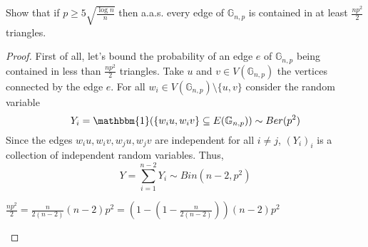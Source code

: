 \begin{problem}
    Show that if $p \geq 5 \sqrt{\frac{\log{n}}{n}}$ then a.a.s. every edge of $\mathbb{G}_{n,p}$ is contained in at least $\frac{n p^2}{2}$ triangles.
    \begin{sol}
        \begin{proof}
            First of all, let's bound the probability of an edge $e$ of $\mathbb{G}_{n,p}$ being contained in less than $\frac{n p^2}{2}$ triangles.
            Take $u$ and $v \in V(\mathbb{G}_{n,p})$ the vertices connected by the edge $e$.
            For all $w_i \in V(\mathbb{G}_{n,p}) \setminus \{u, v\}$ consider the random variable
            \[ Y_i = \mathbbm{1}(\{w_i u, w_i v\} \subseteq E(\mathbb{G}_{n,p})) \sim Ber(p^2) \]
            Since the edges $w_i u, w_i v, w_j u, w_j v$ are independent for all $i \neq j$, $(Y_i)_i$ is a collection of independent random variables.
            Thus,
            \[ Y = \sum_{i=1}^{n-2} Y_i \sim Bin(n-2, p^2) \]

            \begin{claim}
                $\frac{n p^2}{2} = \frac{n}{2(n-2)} (n-2) p^2 = (1 - (1 - \frac{n}{2(n-2)})) (n-2) p^2$
            \end{claim}


\end{proof}
\end{sol}
\end{problem}

